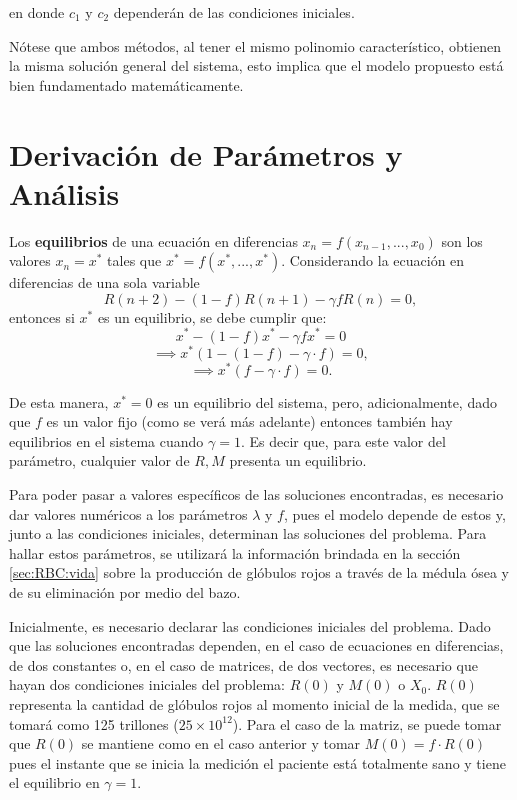 en donde $c_1$ y $c_2$ dependerán de las condiciones iniciales.

Nótese que ambos métodos, al tener el mismo polinomio característico, obtienen la misma solución general del sistema, esto implica que el modelo propuesto está bien fundamentado matemáticamente.


\section{Derivación de Parámetros y Análisis}\label{sec:modelo:parametros}

Los \textbf{equilibrios} de una ecuación en diferencias $x_n=f(x_{n-1},...,x_0)$ son los valores $x_n=x^*$ tales que $x^*=f(x^*,...,x^*)$. Considerando la ecuación en diferencias de una sola variable 
$$R(n+2)-(1-f)R(n+1)-\gamma f R(n)=0,$$
entonces si $x^*$ es un equilibrio, se debe cumplir que:
$$x^*-(1-f)x^*-\gamma f x^*=0$$
$$\implies x^*(1-(1-f)-\gamma\cdot f)=0,$$
$$\implies x^*(f-\gamma\cdot f)=0.$$

De esta manera, $x^*=0$ es un equilibrio del sistema, pero, adicionalmente, dado que $f$ es un valor fijo (como se verá más adelante) entonces también hay equilibrios en el sistema cuando $\gamma = 1$. Es decir que, para este valor del parámetro, cualquier valor de $R,M$ presenta un equilibrio. 

Para poder pasar a valores específicos de las soluciones encontradas, es necesario dar valores numéricos a los parámetros $\lambda$ y $f$, pues el modelo depende de estos y, junto a las condiciones iniciales, determinan las soluciones del problema. Para hallar estos parámetros, se utilizará la información brindada en la sección \ref{sec:RBC:vida} sobre la producción de glóbulos rojos a través de la médula ósea y de su eliminación por medio del bazo.

Inicialmente, es necesario declarar las condiciones iniciales del problema. Dado que las soluciones encontradas dependen, en el caso de ecuaciones en diferencias, de dos constantes o, en el caso de matrices, de dos vectores, es necesario que hayan dos condiciones iniciales del problema: $R(0)$ y $M(0)$ o $X_0$. $R(0)$ representa la cantidad de glóbulos rojos al momento inicial de la medida, que se tomará como 125 trillones ($25\times 10^{12}$). Para el caso de la matriz, se puede tomar que $R(0)$ se mantiene como en el caso anterior y tomar $M(0)=f\cdot R(0)$ pues el instante que se inicia la medición el paciente está totalmente sano y tiene el equilibrio en $\gamma = 1$. 

